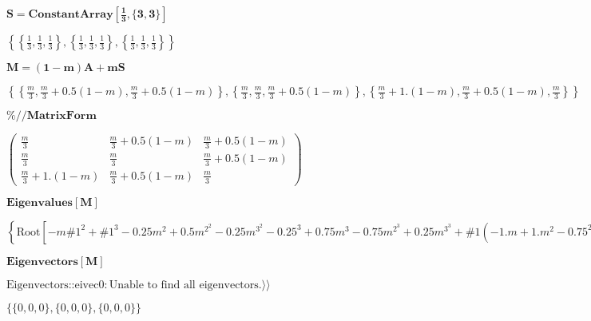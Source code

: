 \documentclass{article}
\begin{document}
\noindent\(\pmb{S=\text{ConstantArray}\left[\frac{1}{3},\{3,3\}\right]}\)

\noindent\(\left\{\left\{\frac{1}{3},\frac{1}{3},\frac{1}{3}\right\},\left\{\frac{1}{3},\frac{1}{3},\frac{1}{3}\right\},\left\{\frac{1}{3},\frac{1}{3},\frac{1}{3}\right\}\right\}\)

\noindent\(\pmb{M=(1-m)A+m S}\)

\noindent\(\left\{\left\{\frac{m}{3},\frac{m}{3}+0.5 (1-m) ,\frac{m}{3}+0.5 (1-m) \right\},\left\{\frac{m}{3},\frac{m}{3},\frac{m}{3}+0.5 (1-m) \right\},\left\{\frac{m}{3}+1.
(1-m) ,\frac{m}{3}+0.5 (1-m) ,\frac{m}{3}\right\}\right\}\)

\noindent\(\pmb{\%\text{//}\text{MatrixForm}}\)

\noindent\(\left(
\begin{array}{ccc}
 \frac{m}{3} & \frac{m}{3}+0.5 (1-m)  & \frac{m}{3}+0.5 (1-m)  \\
 \frac{m}{3} & \frac{m}{3} & \frac{m}{3}+0.5 (1-m)  \\
 \frac{m}{3}+1. (1-m)  & \frac{m}{3}+0.5 (1-m)  & \frac{m}{3}
\end{array}
\right)\)

\noindent\(\pmb{\text{Eigenvalues}[M]}\)

\noindent\(\left\{\text{Root}\left[-m \text{$\#$1}^2+\text{$\#$1}^3-0.25 m ^2+0.5 m^2 ^2-0.25 m^3 ^2-0.25 ^3+0.75 m ^3-0.75 m^2 ^3+0.25 m^3 ^3+\text{$\#$1}
\left(-1. m +1. m^2 -0.75 ^2+1.5 m ^2-0.75 m^2 ^2\right)\&,1\right],\text{Root}\left[-m \text{$\#$1}^2+\text{$\#$1}^3-0.25 m ^2+0.5 m^2 ^2-0.25 m^3
^2-0.25 ^3+0.75 m ^3-0.75 m^2 ^3+0.25 m^3 ^3+\text{$\#$1} \left(-1. m +1. m^2 -0.75 ^2+1.5 m ^2-0.75 m^2 ^2\right)\&,2\right],\text{Root}\left[-m
\text{$\#$1}^2+\text{$\#$1}^3-0.25 m ^2+0.5 m^2 ^2-0.25 m^3 ^2-0.25 ^3+0.75 m ^3-0.75 m^2 ^3+0.25 m^3 ^3+\text{$\#$1} \left(-1. m +1. m^2 -0.75 ^2+1.5
m ^2-0.75 m^2 ^2\right)\&,3\right]\right\}\)

\noindent\(\pmb{\text{Eigenvectors}[M]}\)

\noindent\(\text{Eigenvectors}\text{::}\text{eivec0}: \text{Unable to find all eigenvectors.} \rangle\rangle \)

\noindent\(\{\{0,0,0\},\{0,0,0\},\{0,0,0\}\}\)
\end{document}
